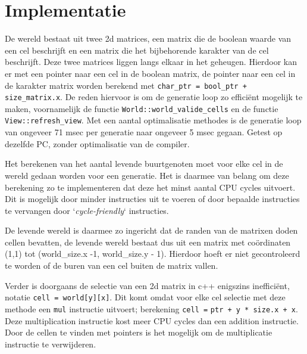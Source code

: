 \documentclass[10pt]{article}
\begin{document}
\section{Implementatie}
De wereld bestaat uit twee 2d matrices, een matrix die de boolean waarde van een cel beschrijft en een matrix die het
bijbehorende karakter van de cel beschrijft. Deze twee matrices liggen langs elkaar in het geheugen. Hierdoor kan er
met een pointer naar een cel in de boolean matrix, de pointer naar een cel in de karakter matrix worden berekend met
\verb|char_ptr = bool_ptr + size_matrix.x|. De reden hiervoor is om de generatie loop zo efficiënt mogelijk te maken,
voornamelijk de functie \verb|World::world_valide_cells| en de functie \verb|View::refresh_view|. Met een aantal
optimalisatie methodes is de generatie loop van ongeveer 71 msec per generatie naar ongeveer 5 msec gegaan. Getest
op dezelfde PC, zonder optimalisatie van de compiler.

Het berekenen van het aantal levende buurtgenoten moet voor elke cel in de wereld gedaan worden voor een
generatie. Het is daarmee van belang om deze berekening zo te implementeren dat deze het minst aantal CPU cycles
uitvoert. Dit is mogelijk door minder instructies uit te voeren of door bepaalde instructies te vervangen door
`\textit{cycle-friendly}` instructies.

De levende wereld is daarmee zo ingericht dat de randen van de matrixen doden cellen
bevatten, de levende wereld bestaat dus uit een matrix met coördinaten	(1,1) tot (world\_size.x -1, world\_size.y -
1).
Hierdoor hoeft er niet gecontroleerd te worden of de buren van een cel buiten de matrix vallen.

Verder is doorgaans de selectie van een 2d matrix in c++ enigszins  inefficiënt, notatie \verb|cell = world[y][x]|. Dit
komt omdat voor elke cel selectie met deze methode een \verb|mul| instructie uitvoert; berekening \verb|cell =|
\verb|ptr + y * size.x + x|. Deze multiplication instructie
kost meer CPU cycles dan een addition instructie\cite{cpu-cost-instructions}. Door de cellen te vinden met pointers is
het mogelijk om de multiplicatie instructie te verwijderen.
\end{document}
